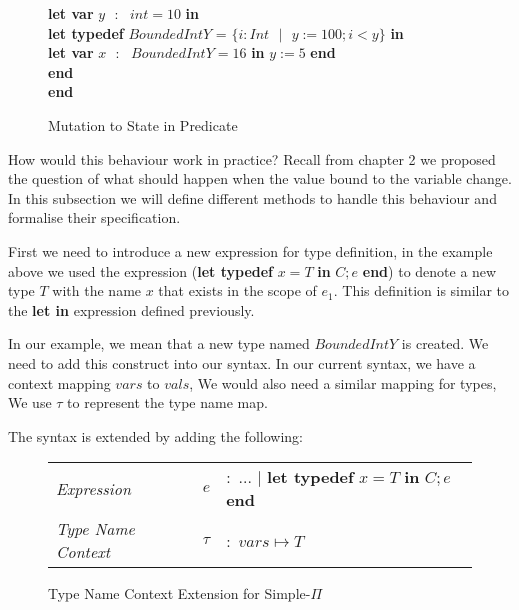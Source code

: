 \documentclass[a4paper,12pt]{report}
\newenvironment{tabs}[1]
 {\flushleft\TabPositions{#1}}
 {\endflushleft}
\begin{document}
\begin{figure} [H]
  \begin{tabs}{1cm,2cm}
    \textbf{let var }$y\text{ }:\text{ } int = 10$ \textbf{ in } \\
    \tab\textbf{let typedef }$BoundedIntY$ = $\{i : Int\text{ }|\text{ } y := 100;i < y\}$ \textbf{ in } \\ 
    \tab\tab\textbf{let var }$x\text{ }:\text{ }BoundedIntY = 16$ \textbf{ in }$y := 5$\textbf { end} \\
    \tab\textbf {end} \\
    \textbf{end}
  \end{tabs}  
  \caption{Mutation to State in Predicate}
\end{figure}


\par
How would this behaviour work in practice? Recall from chapter 2 we proposed the 
question of what should happen when the value bound to the variable change. In 
this subsection we will define different methods to handle this behaviour and 
formalise their specification.

\par
First we need to introduce a new expression for type definition, in the example 
above we used the expression (\textbf{let typedef} $x = T$ \textbf{ in }$C;e$ \textbf {end}) 
to denote a new type $T$ with the name $x$ that exists in the scope of $e_1$. 
This definition is similar to the \textbf{let in} expression defined previously. 

In our example, we mean 
that a new type named $BoundedIntY$ is created. We need to add this construct 
into our syntax. In our current syntax, we have a context mapping $vars$ to 
$vals$, We would also need a similar mapping for types, We use $\tau$ to 
represent the type name map. 

\par
The syntax is extended by adding the following: 
\begin{figure}[H]
  \begin{center}
    \begin{tabular} {l l l}
      \textit{Expression} & $e$ & $:$ ... $|$ \textbf{let typedef }$x = T\textbf{ in } C;e$ \textbf{ end} \\
      \textit{Type Name Context} & $\tau$& $:$ $vars \mapsto T$ \\
    \end{tabular}
  \end{center}
  \caption{Type Name Context Extension for Simple-$\Pi$}
\end{figure}
\end{document}
